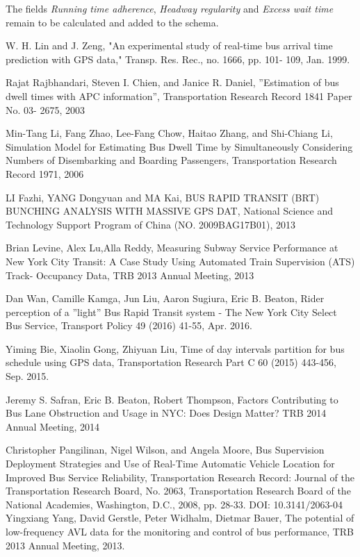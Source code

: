 \documentclass[12pt]{report}
\begin{document}
The fields \textit{Running time adherence}, \textit{Headway regularity} and \textit{Excess wait time} remain to be calculated and added to the schema.

\begin{thebibliography}{9}

W. H. Lin and J. Zeng, "An experimental study of real-time bus arrival time prediction with GPS data," Transp. Res. Rec., no. 1666, pp. 101- 109, Jan. 1999.

Rajat Rajbhandari, Steven I. Chien, and Janice R. Daniel, ''Estimation of bus dwell times with APC information'', Transportation Research Record 1841 Paper No. 03- 2675, 2003

Min-Tang Li, Fang Zhao, Lee-Fang Chow, Haitao Zhang, and Shi-Chiang Li, Simulation Model for Estimating Bus Dwell Time by Simultaneously Considering Numbers of Disembarking and
Boarding Passengers, Transportation Research Record 1971, 2006

LI Fazhi, YANG Dongyuan and MA Kai, BUS RAPID TRANSIT (BRT) BUNCHING ANALYSIS WITH MASSIVE GPS DAT, National Science and Technology Support Program of China (NO. 2009BAG17B01), 2013

Brian Levine, Alex Lu,Alla Reddy, Measuring Subway Service Performance at New York City Transit: A Case Study Using Automated Train Supervision (ATS) Track- Occupancy Data, TRB 2013 Annual Meeting, 2013

Dan Wan, Camille Kamga, Jun Liu, Aaron Sugiura, Eric B. Beaton, Rider perception of a ''light'' Bus Rapid Transit system - The New York City Select Bus Service, Transport Policy 49 (2016) 41-55, Apr. 2016.

Yiming Bie, Xiaolin Gong, Zhiyuan Liu, Time of day intervals partition for bus schedule using GPS data, Transportation Research Part C 60 (2015) 443-456, Sep. 2015.

Jeremy S. Safran, Eric B. Beaton, Robert Thompson, Factors Contributing to Bus Lane Obstruction and Usage in NYC: Does Design Matter? TRB 2014 Annual Meeting, 2014
 
Christopher Pangilinan, Nigel Wilson, and Angela Moore, Bus Supervision Deployment Strategies and Use of Real-Time Automatic
Vehicle Location for Improved
Bus Service Reliability, Transportation Research Record: Journal of the Transportation Research Board, No. 2063, Transportation Research Board of the National Academies, Washington, D.C., 2008, pp. 28-33.
DOI: 10.3141/2063-04
Yingxiang Yang, David Gerstle, Peter Widhalm, Dietmar Bauer, The potential of low-frequency AVL data for the monitoring and control of bus performance, TRB 2013 Annual Meeting, 2013.


\end{thebibliography}
\end{document}
